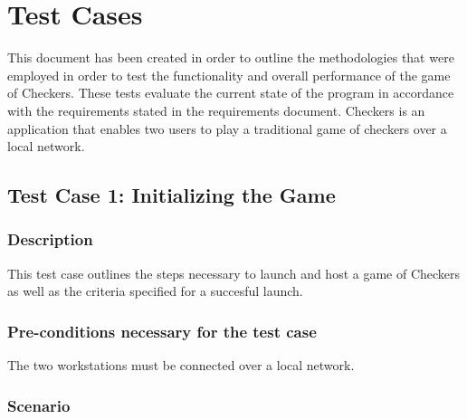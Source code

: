 \section{Test Cases}
This document has been created in order to outline the methodologies that were employed in order to
 test the functionality and overall performance of the game of Checkers. These tests evaluate the current 
state of the program in accordance with the requirements stated in the requirements document. Checkers 
is an application that enables two users to play a traditional game of checkers over a local network. 
\subsection{Test Case 1: Initializing the Game}
\subsubsection{Description}
This test case outlines the steps necessary to launch and host a game of Checkers as well as the criteria 
specified for a succesful launch. 
\subsubsection{Pre-conditions necessary for the test case}
The two workstations must be connected over a local network. 
\subsubsection{Scenario}

